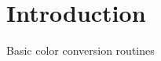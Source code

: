 \hypertarget{index_Introduction}{}\section{Introduction}\label{index_Introduction}
Basic color conversion routines

 